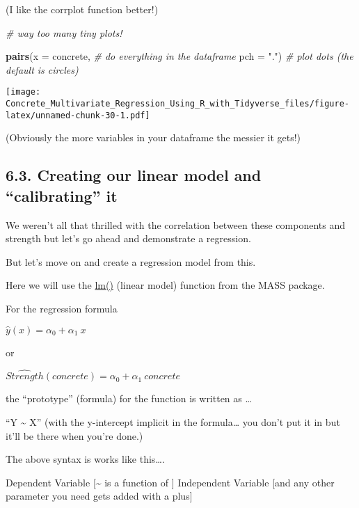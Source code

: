 \documentclass[]{article}
\newenvironment{Shaded}{\begin{snugshade}}{\end{snugshade}}
\newcommand{\CommentTok}[1]{\textcolor[rgb]{0.56,0.35,0.01}{\textit{#1}}}
\newcommand{\DataTypeTok}[1]{\textcolor[rgb]{0.13,0.29,0.53}{#1}}
\newcommand{\KeywordTok}[1]{\textcolor[rgb]{0.13,0.29,0.53}{\textbf{#1}}}
\newcommand{\NormalTok}[1]{#1}
\newcommand{\StringTok}[1]{\textcolor[rgb]{0.31,0.60,0.02}{#1}}
\begin{document}
(I like the corrplot function better!)

\begin{Shaded}
\begin{Highlighting}[]
\CommentTok{# way too many tiny plots!}

\KeywordTok{pairs}\NormalTok{(}\DataTypeTok{x   =}\NormalTok{ concrete, }\CommentTok{# do everything in the dataframe}
      \DataTypeTok{pch =} \StringTok{"."}\NormalTok{)      }\CommentTok{# plot dots (the default is circles)}
\end{Highlighting}
\end{Shaded}

\texttt{[image: Concrete\_Multivariate\_Regression\_Using\_R\_with\_Tidyverse\_files/figure-latex/unnamed-chunk-30-1.pdf]}

(Obviously the more variables in your dataframe the messier it gets!)

\hypertarget{creating-our-linear-model-and-calibrating-it}{%
\subsection{6.3. Creating our linear model and ``calibrating''
it}\label{creating-our-linear-model-and-calibrating-it}}

We weren't all that thrilled with the correlation between these
components and strength but let's go ahead and demonstrate a regression.

But let's move on and create a regression model from this.

Here we will use the
\href{https://www.rdocumentation.org/packages/stats/versions/3.4.3/topics/lm}{lm()}
(linear model) function from the MASS package.

For the regression formula

\(\widehat{y}(x) = {\alpha_0}+{\alpha_1}\ x\)

or

\(\widehat{Strength}(concrete) = {\alpha_0}+{\alpha_1}\ concrete\)

the ``prototype'' (formula) for the function is written as \ldots{}

``Y \textasciitilde{} X'' (with the y-intercept implicit in the
formula\ldots{} you don't put it in but it'll be there when you're
done.)

The above syntax is works like this\ldots{}.

Dependent Variable {[}\textasciitilde{} is a function of {]} Independent
Variable {[}and any other parameter you need gets added with a plus{]}
\end{document}
